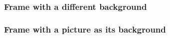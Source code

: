 \begin{frame}
	
	\frametitle{Frame with a different background}
	
\end{frame}



\begin{frame}
	
	\frametitle{Frame with a picture as its background}
	
\end{frame}
\usebackgroundtemplate{}

